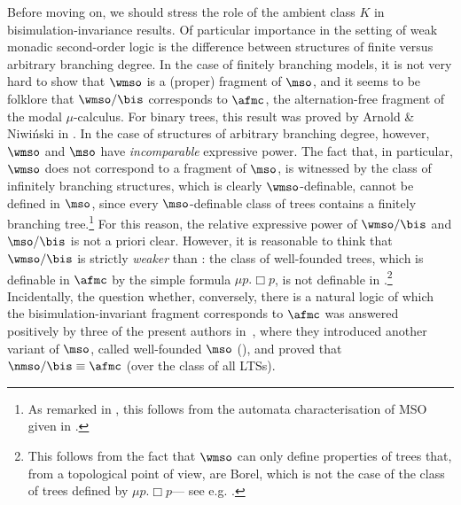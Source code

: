 Before moving on, we should stress the role of the ambient class $K$ in
bisimulation-invariance results.
Of particular importance in the setting of weak monadic second-order logic is
the difference between structures of finite versus arbitrary branching degree.
In the case of finitely branching models, it is not very hard to show that
$\wmso$ is a (proper) fragment of $\mso$, and it seems to be folklore that
$\wmso/{\bis}$ corresponds to $\afmc$, the alternation-free fragment of the
modal $\mu$-calculus.
For binary trees, this result was proved by Arnold \& Niwi{\'n}ski in
\cite{ArnoldN01}.
In the case of structures of arbitrary branching degree, however, $\wmso$
and $\mso$ have \emph{incomparable} expressive power.
The fact that, in particular, $\wmso$ does not correspond to a fragment of
$\mso$, is witnessed by the class of infinitely branching structures, which
is clearly $\wmso$-definable, cannot be defined in $\mso$, since every
$\mso$-definable class of trees contains a finitely branching
tree.\footnote{As remarked in \cite{CateF11}, this follows from the automata characterisation of MSO given in \cite{Walukiewicz96}.} %
For this reason, the relative expressive power of $\wmso/{\bis}$ and
$\mso/{\bis}$ is not a priori clear.
However, it is reasonable to think that $\wmso/{\bis}$ is strictly \emph{weaker} than \afmc: the class of well-founded trees, which is definable in $\afmc$ by
the simple formula $\mu p. \Box p$, is not definable in \wmso.\footnote{This follows from the fact that $\wmso$ can only define properties of trees that, from a topological point of view, are Borel, which is not the case of the class of trees defined by $\mu p. \Box p$--- see e.g. \cite{CateF11}.}
Incidentally, the question whether, conversely, there is a natural logic of
which the
bisimulation-invariant fragment corresponds to $\afmc$ was answered positively
by three of the present authors in~\cite{DBLP:conf/lics/FacchiniVZ13}, where they introduced
another variant of $\mso$, called well-founded $\mso$ (\nmso), and proved
that $\nmso/{\bis} \equiv \afmc$ (over the class of all LTSs).

